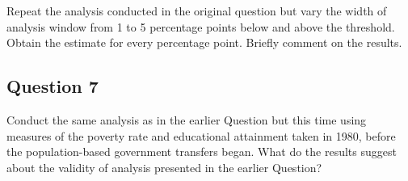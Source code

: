 \documentclass[]{article}
\begin{document}
Repeat the analysis conducted in the original question but vary the
width of analysis window from 1 to 5 percentage points below and above
the threshold. Obtain the estimate for every percentage point. Briefly
comment on the results.

\subsection{Question 7}\label{question-7}

Conduct the same analysis as in the earlier Question but this time using
measures of the poverty rate and educational attainment taken in 1980,
before the population-based government transfers began. What do the
results suggest about the validity of analysis presented in the earlier
Question?
\end{document}
